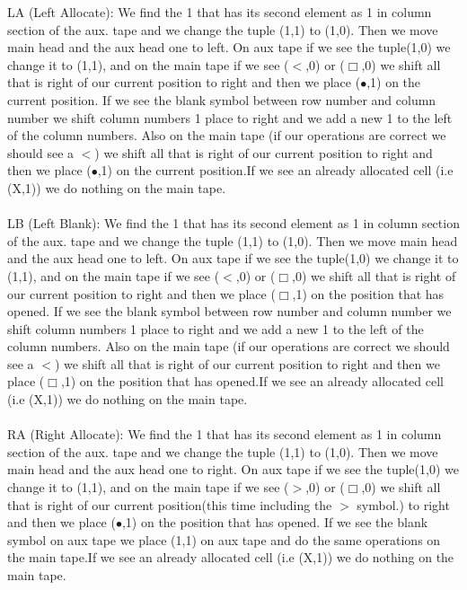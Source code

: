 \documentclass[12pt]{article}
\begin{document}
LA (Left Allocate): We find the 1 that has its second element as 1 in column section of the aux. tape and we change the tuple (1,1) to (1,0). Then we move main head and the aux head one to left. On aux tape if we see the tuple(1,0) we change it to (1,1), and on the main tape if we see ($<$,0) or ($\Box$,0) we shift all that is right of our current position to right and then we place ($\bullet$,1) on the current position. If we see the blank symbol between row number and column number we shift column numbers 1 place to right and we add a new 1 to the left of the column numbers. Also on the main tape (if our operations are correct we should see a $<$) we shift all that is right of our current position to right and then we place ($\bullet$,1) on the current position.If we see an already allocated cell (i.e (X,1)) we do nothing on the main tape.\\
\\
LB (Left Blank): We find the 1 that has its second element as 1 in column section of the aux. tape and we change the tuple (1,1) to (1,0). Then we move main head and the aux head one to left. On aux tape if we see the tuple(1,0) we change it to (1,1), and on the main tape if we see ($<$,0) or ($\Box$,0) we shift all that is right of our current position to right and then we place ($\Box$,1) on the position that has opened. If we see the blank symbol between row number and column number we shift column numbers 1 place to right and we add a new 1 to the left of the column numbers. Also on the main tape (if our operations are correct we should see a $<$) we shift all that is right of our current position to right and then we place ($\Box$,1) on the position that has opened.If we see an already allocated cell (i.e (X,1)) we do nothing on the main tape.\\
\\
RA (Right Allocate): We find the 1 that has its second element as 1 in column section of the aux. tape and we change the tuple (1,1) to (1,0). Then we move main head and the aux head one to right. On aux tape if we see the tuple(1,0) we change it to (1,1), and on the main tape if we see ($>$,0) or ($\Box$,0) we shift all that is right of our current position(this time including the $>$ symbol.) to right and then we place ($\bullet$,1) on the position that has opened. If we see the blank symbol on aux tape we place (1,1) on aux tape and do the same operations on the main tape.If we see an already allocated cell (i.e (X,1)) we do nothing on the main tape.\\
\\
\end{document}
